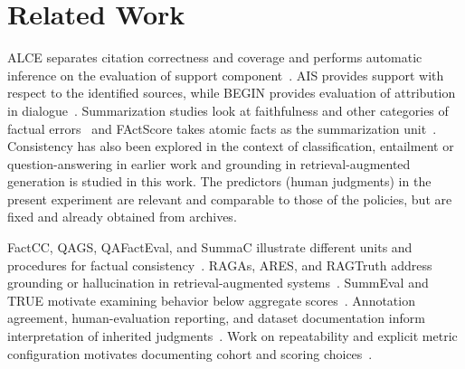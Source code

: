 \documentclass[acmsmall,screen,nonacm]{acmart}
\begin{document}
\section{Related Work}
ALCE separates citation correctness and coverage and performs automatic inference on the evaluation of support component~\cite{gao2023}. AIS provides support with respect to the identified sources, while BEGIN provides evaluation of attribution in dialogue~\cite{rashkin2023,begin}. Summarization studies look at faithfulness and other categories of factual errors~\cite{maynez, frank} and FActScore takes atomic facts as the summarization unit~\cite{factscore}. Consistency has also been explored in the context of classification, entailment or question-answering in earlier work and grounding in retrieval-augmented generation is studied in this work. The predictors (human judgments) in the present experiment are relevant and comparable to those of the policies, but are fixed and already obtained from archives.

FactCC, QAGS, QAFactEval, and SummaC illustrate different units and procedures for factual consistency~\cite{factcc,qags,qafacteval,summac}. RAGAs, ARES, and RAGTruth address grounding or hallucination in retrieval-augmented systems~\cite{ragas,ares,ragtruth}. SummEval and TRUE motivate examining behavior below aggregate scores~\cite{summeval,true}. Annotation agreement, human-evaluation reporting, and dataset documentation inform interpretation of inherited judgments~\cite{agreement,howcroft,datastatements}. Work on repeatability and explicit metric configuration motivates documenting cohort and scoring choices~\cite{belz,post}.
\end{document}
